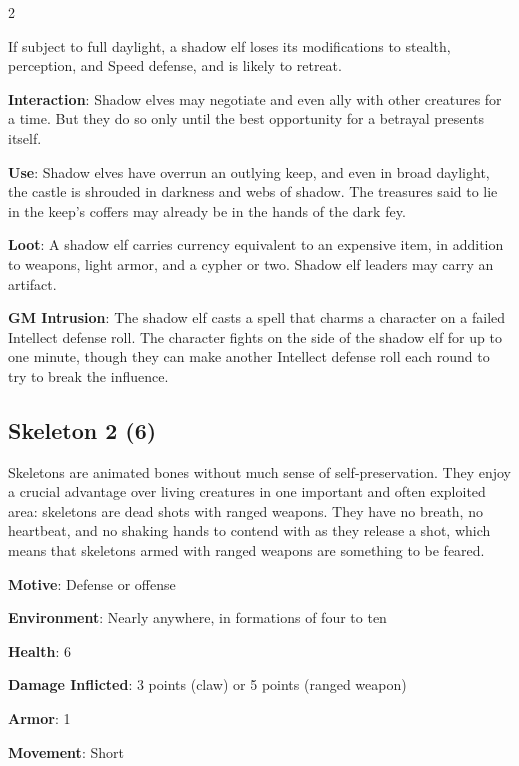 \begin{multicols}{2}

If subject to full daylight, a shadow elf loses its modifications to stealth, perception, and Speed defense, and is likely to retreat.

\textbf{Interaction}: Shadow elves may negotiate and even ally with other creatures for a time. But they do so only until the best opportunity for a betrayal presents itself.

\textbf{Use}: Shadow elves have overrun an outlying keep, and even in broad daylight, the castle is shrouded in darkness and webs of shadow. The treasures said to lie in the keep’s coffers may already be in the hands of the dark fey.

\textbf{Loot}: A shadow elf carries currency equivalent to an expensive item, in addition to weapons, light armor, and a cypher or two. Shadow elf leaders may carry an artifact.

\textbf{GM Intrusion}: The shadow elf casts a spell that charms a character on a failed Intellect defense roll. The character fights on the side of the shadow elf for up to one minute, though they can make another Intellect defense roll each round to try to break the influence.

\subsection{Skeleton	2 (6)}

Skeletons are animated bones without much sense of self-preservation. They enjoy a crucial advantage over living creatures in one important and often exploited area: skeletons are dead shots with ranged weapons. They have no breath, no heartbeat, and no shaking hands to contend with as they release a shot, which means that skeletons armed with ranged weapons are something to be feared.

\textbf{Motive}: Defense or offense

\textbf{Environment}: Nearly anywhere, in formations of four to ten 

\textbf{Health}: 6

\textbf{Damage Inflicted}: 3 points (claw) or 5 points (ranged weapon)

\textbf{Armor}: 1

\textbf{Movement}: Short


\end{multicols}
